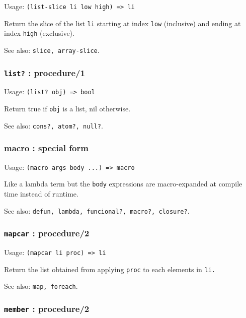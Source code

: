 \documentclass[
]{article}
\newcommand{\passthrough}[1]{#1}
\begin{document}
Usage: \passthrough{\lstinline!(list-slice li low high) => li!}

Return the slice of the list \passthrough{\lstinline!li!} starting at
index \passthrough{\lstinline!low!} (inclusive) and ending at index
\passthrough{\lstinline!high!} (exclusive).

See also: \passthrough{\lstinline!slice, array-slice!}.

\hypertarget{list-procedure1}{%
\subsubsection{\texorpdfstring{\texttt{list?} :
procedure/1}{list? : procedure/1}}\label{list-procedure1}}

Usage: \passthrough{\lstinline!(list? obj) => bool!}

Return true if \passthrough{\lstinline!obj!} is a list, nil otherwise.

See also: \passthrough{\lstinline!cons?, atom?, null?!}.

\hypertarget{macro-special-form}{%
\subsubsection{macro : special form}\label{macro-special-form}}

Usage: \passthrough{\lstinline!(macro args body ...) => macro!}

Like a lambda term but the \passthrough{\lstinline!body!} expressions
are macro-expanded at compile time instead of runtime.

See also:
\passthrough{\lstinline!defun, lambda, funcional?, macro?, closure?!}.

\hypertarget{mapcar-procedure2}{%
\subsubsection{\texorpdfstring{\texttt{mapcar} :
procedure/2}{mapcar : procedure/2}}\label{mapcar-procedure2}}

Usage: \passthrough{\lstinline!(mapcar li proc) => li!}

Return the list obtained from applying \passthrough{\lstinline!proc!} to
each elements in \passthrough{\lstinline!li.!}

See also: \passthrough{\lstinline!map, foreach!}.

\hypertarget{member-procedure2}{%
\subsubsection{\texorpdfstring{\texttt{member} :
procedure/2}{member : procedure/2}}\label{member-procedure2}}
\end{document}
